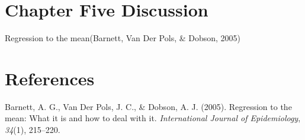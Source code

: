 \documentclass[
  english,
  man]{apa6}
\newlength{\cslhangindent}
\newenvironment{CSLReferences}[2] %
 {%
  \setlength{\parindent}{0pt}
  \ifodd #1 \everypar{\setlength{\hangindent}{\cslhangindent}}\ignorespaces\fi
  \ifnum #2 > 0
  \setlength{\parskip}{#2\baselineskip}
  \fi
 }%
 {}
\begin{document}
\hypertarget{chapter-five-discussion}{%
\section{Chapter Five Discussion}\label{chapter-five-discussion}}

Regression to the mean(Barnett, Van Der Pols, \& Dobson, 2005)

\newpage

\hypertarget{references}{%
\section{References}\label{references}}

\begingroup
\setlength{\parindent}{-0.5in}
\setlength{\leftskip}{0.5in}

\hypertarget{refs}{}
\begin{CSLReferences}{1}{0}
\leavevmode{}%
Barnett, A. G., Van Der Pols, J. C., \& Dobson, A. J. (2005). Regression to the mean: What it is and how to deal with it. \emph{International Journal of Epidemiology}, \emph{34}(1), 215--220.

\end{CSLReferences}

\endgroup
\end{document}
